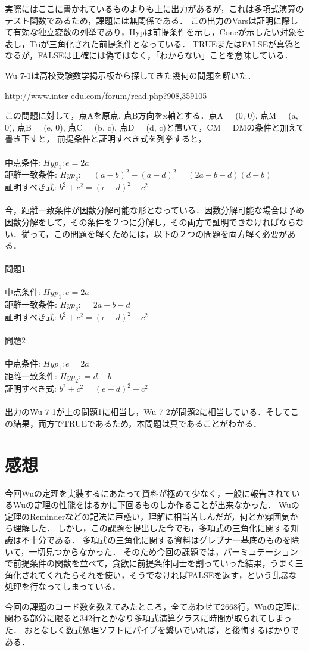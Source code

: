 \documentclass{jarticle}
\begin{document}
実際にはここに書かれているものよりも上に出力があるが，これは多項式演算のテスト関数であるため，課題には無関係である．
この出力のVarsは証明に際して有効な独立変数の列挙であり，Hypは前提条件を示し，Concが示したい対象を表し，Triが三角化された前提条件となっている．
TRUEまたはFALSEが真偽となるが，FALSEは正確には偽ではなく，「わからない」ことを意味している．

Wu 7-1は高校受験数学掲示板から探してきた幾何の問題を解いた．

http://www.inter-edu.com/forum/read.php?908,359105


この問題に対して，点Aを原点, 点B方向をx軸とする．点A = (0, 0), 点M = (a, 0), 点B = (e, 0), 点C = (b, c), 点D = (d, c)と置いて，CM = DMの条件と加えて書き下すと，
前提条件と証明すべき式を列挙すると，\\
\\
中点条件: $Hyp_1: e = 2 a$\\
距離一致条件: $Hyp_2: = (a - b)^2 - (a - d)^2 = (2 a - b - d) (d - b)$\\
証明すべき式: $b^2 + c^2 = (e - d)^2 + c^2$\\
\\
今，距離一致条件が因数分解可能な形となっている．因数分解可能な場合は予め因数分解をして，その条件を２つに分解し，その両方で証明できなければならない．従って，この問題を解くためには，以下の２つの問題を両方解く必要がある．\\
\\
問題1\\
\\
中点条件: $Hyp_1: e = 2 a$\\
距離一致条件: $Hyp_2: = 2 a - b - d$\\
証明すべき式: $b^2 + c^2 = (e - d)^2 + c^2$\\
\\
問題2\\
\\
中点条件: $Hyp_1: e = 2 a$\\
距離一致条件: $Hyp_2: = d - b$\\
証明すべき式: $b^2 + c^2 = (e - d)^2 + c^2$\\
\\
出力のWu 7-1が上の問題1に相当し，Wu 7-2が問題2に相当している．そしてこの結果，両方でTRUEであるため，本問題は真であることがわかる．

\section{感想}
今回Wuの定理を実装するにあたって資料が極めて少なく，一般に報告されているWuの定理の性能をはるかに下回るものしか作ることが出来なかった．
Wuの定理のReminderなどの記法に戸惑い，理解に相当苦しんだが，何とか雰囲気から理解した．
しかし，この課題を提出した今でも，多項式の三角化に関する知識は不十分である．
多項式の三角化に関する資料はグレブナー基底のものを除いて，一切見つからなかった．
そのため今回の課題では，パーミュテーションで前提条件の関数を並べて，貪欲に前提条件同士を割っていった結果，うまく三角化されてくれたらそれを使い，そうでなければFALSEを返す，という乱暴な処理を行なってしまっている．

今回の課題のコード数を数えてみたところ，全てあわせて2668行，Wuの定理に関わる部分に限ると342行とかなり多項式演算クラスに時間が取られてしまった．
おとなしく数式処理ソフトにパイプを繋いでいれば，と後悔するばかりである．
\end{document}
